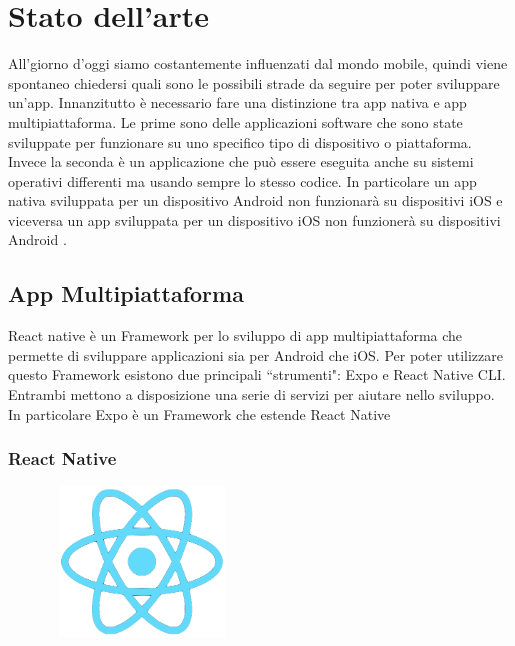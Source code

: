 \chapter{Stato dell'arte}
All'giorno d'oggi siamo costantemente influenzati dal mondo mobile, quindi viene spontaneo chiedersi quali sono le possibili strade da seguire per poter sviluppare un'app.
Innanzitutto \`e necessario fare una distinzione tra app nativa e app multipiattaforma.
Le prime sono delle applicazioni software che sono state sviluppate per funzionare su uno
specifico tipo di dispositivo o piattaforma. Invece la seconda \`e un applicazione che pu\`o essere eseguita anche su sistemi operativi differenti ma usando sempre lo stesso codice.
In particolare un app nativa sviluppata per un dispositivo Android non funzionar\`a su dispositivi iOS e viceversa un app sviluppata
per un dispositivo iOS non funzioner\`a su dispositivi Android \cite{ReactNativeCLI:Expo} \cite{app:ibride:native}.\\

\section{App Multipiattaforma}
React native \`e un Framework per lo sviluppo di app multipiattaforma che permette di sviluppare applicazioni sia per Android che iOS.
Per poter utilizzare questo Framework esistono due principali ``strumenti": Expo\cite{ReactNativeCLI:Expo} e React Native CLI\cite{ReactNativeCLI:Expo}.
Entrambi mettono a disposizione una serie di servizi per aiutare nello sviluppo. In particolare Expo \`e un Framework che estende React Native
\subsection{React Native}
\begin{figure}[h]
      \centering
      \includegraphics[width=5cm, height=4cm]{images/ReactNativeLogo-NoBackground.png}
      \caption[differenzeiteot]{}
      \label{fig:ReactNative}
\end{figure}

